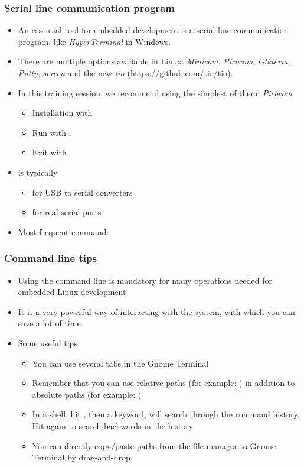 \begin{frame}
  \frametitle{Serial line communication program}
  \begin{itemize}
  \item An essential tool for embedded development is a serial line
    communication program, like {\em HyperTerminal} in Windows.
  \item There are multiple options available in Linux: {\em Minicom},
    {\em Picocom}, {\em Gtkterm}, {\em Putty}, {\em screen} and the new {\em tio}
    (\url{https://github.com/tio/tio}).
  \item In this training session, we recommend using the simplest of
    them: {\em Picocom}
    \begin{itemize}
    \item Installation with 
    \item Run with .
    \item Exit with \code{[Ctrl][a] [Ctrl][x]}
    \end{itemize}
  \item {} is typically
    \begin{itemize}
    \item {} for USB to serial converters
    \item {} for real serial ports
    \end{itemize}
  \item Most frequent command: 
  \end{itemize}
\end{frame}

\begin{frame}
  \frametitle{Command line tips}
  \begin{itemize}
  \item Using the command line is mandatory for many operations needed
    for embedded Linux development
  \item It is a very powerful way of interacting with the system, with
    which you can save a lot of time.
  \item Some useful tips
    \begin{itemize}
    \item You can use several tabs in the Gnome Terminal
    \item Remember that you can use relative paths (for example:
      ) in addition to absolute paths (for example:
      )
    \item In a shell, hit \code{[Control] [r]}, then a keyword, will
      search through the command history. Hit \code{[Control] [r]}
      again to search backwards in the history
    \item You can directly copy/paste paths from the file manager to
      Gnome Terminal by drag-and-drop.
    \end{itemize}
  \end{itemize}
\end{frame}

